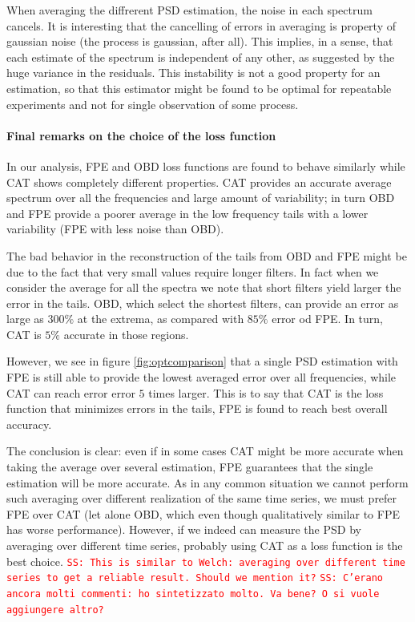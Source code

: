 \documentclass[twocolumn,showpacs,preprintnumbers,nofootinbib,prd,
superscriptaddress,10pt]{revtex4-1}
\newcommand{\sschmidt}[1]{{\textcolor{red}{\texttt{SS: #1}} }}
\begin{document}
When averaging the diffrerent PSD estimation, the noise in each spectrum cancels. It is interesting that the cancelling of errors in averaging is property of gaussian noise (the process is gaussian, after all). This implies, in a sense, that each estimate of the spectrum is independent of any other, as suggested by the huge variance in the residuals. This instability is not a good property for an estimation, so that this estimator might be found to be optimal for repeatable experiments and not for single observation of some process.

\paragraph{Final remarks on the choice of the loss function}

In our analysis, FPE and OBD loss functions are found to behave similarly while CAT shows completely different properties.
CAT provides an accurate average spectrum over all the frequencies and large amount of variability; in turn OBD and FPE provide a poorer average in the low frequency tails with a lower variability (FPE with less noise than OBD).

The bad behavior in the reconstruction of the tails from OBD and FPE might be due to the fact that very small values require longer filters. 
In fact when we consider the average for all the spectra we note that short filters yield larger the error in the tails. OBD, which select the shortest filters, can provide an error as large as $300 \%$ at the extrema, as compared with $85\%$ error od FPE. In turn, CAT is $5\%$ accurate in those regions.

However, we see in figure \ref{fig:optcomparison} that a single PSD estimation with FPE is still able to provide the lowest averaged error over all frequencies, while CAT can reach error error $5$ times larger.
This is to say that CAT is the loss function that minimizes errors in the tails, FPE is found to reach best overall accuracy. 

The conclusion is clear: even if in some cases CAT might be more accurate when taking the average over several estimation, FPE guarantees that the single estimation will be more accurate.
As in any common situation we cannot perform such averaging over different realization of the same time series, we must prefer FPE over CAT (let alone OBD, which even though qualitatively similar to FPE has worse performance).
However, if we indeed can measure the PSD by averaging over different time series, probably using CAT as a loss function is the best choice.
\sschmidt{This is similar to Welch: averaging over different time series to get a reliable result. Should we mention it?}
\sschmidt{C'erano ancora molti commenti: ho sintetizzato molto. Va bene? O si vuole aggiungere altro?}
\end{document}
